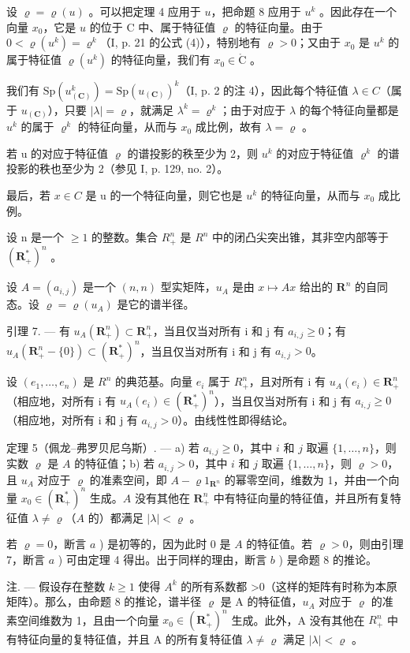 设 \(\varrho = \varrho(u)\) 。可以把定理 4 应用于 \(u\)，把命题 8 应用于 \(u^k\) 。因此存在一个向量 \(x_0\)，它是 \(u\) 的位于 C 中、属于特征值 \(\varrho\) 的特征向量。由于 \(0 < \varrho(u^k) = \varrho^k\)（I, p. 21 的公式 (4)），特别地有 \(\varrho > 0\)；又由于 \(x_0\) 是 \(u^k\) 的属于特征值 \(\varrho(u^k)\) 的特征向量，我们有 \(x_0 \in \mathring{\mathrm{C}}\) 。

我们有 \(\mathrm{Sp}(u_{(\mathbf{C})}^{k})=\mathrm{Sp}(u_{(\mathbf{C})})^{k}\)（I, p. 2 的注 4），因此每个特征值 \(\lambda\in C\)（属于 \(u_{(\mathbf{C})}\)），只要 \(|\lambda|=\varrho\)，就满足 \(\lambda^{k}=\varrho^{k}\)；由于对应于 \(\lambda\) 的每个特征向量都是 \(u^{k}\) 的属于 \(\varrho^{k}\) 的特征向量，从而与 \(x_{0}\) 成比例，故有 \(\lambda=\varrho\) 。

若 u 的对应于特征值 \(\varrho\) 的谱投影的秩至少为 2，则 \(u^{k}\) 的对应于特征值 \(\varrho^{k}\) 的谱投影的秩也至少为 2（参见 I, p. 129, no. 2）。

最后，若 \(x \in C\) 是 u 的一个特征向量，则它也是 \(u^{k}\) 的特征向量，从而与 \(x_{0}\) 成比例。

设 n 是一个 \(\geqslant 1\) 的整数。集合 \(R_{+}^{n}\) 是 \(R^{n}\) 中的闭凸尖突出锥，其非空内部等于 \((\mathbf{R}_{+}^{*})^{n}\) 。

设 \(A = (a_{i,j})\) 是一个 \((n,n)\) 型实矩阵，\(u_A\) 是由 \(x \mapsto Ax\) 给出的 \(\mathbf{R}^n\) 的自同态。设 \(\varrho = \varrho(u_A)\) 是它的谱半径。

引理 7. --- 有 \(u_A(\mathbf{R}_+^n) \subset \mathbf{R}_+^n\)，当且仅当对所有 i 和 j 有 \(a_{i,j} \geqslant 0\)；有 \(u_A(\mathbf{R}_+^n - \{0\}) \subset (\mathbf{R}_+^*)^n\)，当且仅当对所有 i 和 j 有 \(a_{i,j} > 0\)。

设 \((e_{1},\ldots,e_{n})\) 是 \(R^{n}\) 的典范基。向量 \(e_{i}\) 属于 \(R_{+}^{n}\)，且对所有 i 有 \(u_{A}(e_{i})\in\mathbf{R}_{+}^{n}\)（相应地，对所有 i 有 \(u_{A}(e_{i})\in(\mathbf{R}_{+}^{*})^{n}\)），当且仅当对所有 i 和 j 有 \(a_{i,j}\geqslant0\)（相应地，对所有 i 和 j 有 \(a_{i,j}>0\)）。由线性性即得结论。

定理 5（佩龙–弗罗贝尼乌斯）. --- a) 若 \(a_{i,j} \geqslant 0\)，其中 \(i\) 和 \(j\) 取遍 \(\{1,\ldots,n\}\)，则实数 \(\varrho\) 是 \(A\) 的特征值；b) 若 \(a_{i,j} > 0\)，其中 \(i\) 和 \(j\) 取遍 \(\{1,\ldots,n\}\)，则 \(\varrho > 0\)，且 \(u_A\) 对应于 \(\varrho\) 的准素空间，即 \(A - \varrho 1_{\mathbf{R}^n}\) 的幂零空间，维数为 1，并由一个向量 \(x_0 \in (\mathbf{R}_+^*)^n\) 生成。\(A\) 没有其他在 \(\mathbf{R}_+^n\) 中有特征向量的特征值，并且所有复特征值 \(\lambda \neq \varrho\)（\(A\) 的）都满足 \(|\lambda| < \varrho\) 。

若 \(\varrho = 0\)，断言 \(a\) ) 是初等的，因为此时 0 是 \(A\) 的特征值。若 \(\varrho > 0\)，则由引理 7，断言 \(a\) ) 可由定理 4 得出。出于同样的理由，断言 \(b\) ) 是命题 8 的推论。

注. --- 假设存在整数 \(k \geqslant 1\) 使得 \(A^{k}\) 的所有系数都 \textgreater0（这样的矩阵有时称为本原矩阵）。那么，由命题 8 的推论，谱半径 \(\varrho\) 是 A 的特征值，\(u_{A}\) 对应于 \(\varrho\) 的准素空间维数为 1，且由一个向量 \(x_{0} \in (\mathbf{R}_{+}^{*})^{n}\) 生成。此外，A 没有其他在 \(R_{+}^{n}\) 中有特征向量的复特征值，并且 A 的所有复特征值 \(\lambda \neq \varrho\) 满足 \(|\lambda| < \varrho\) 。

